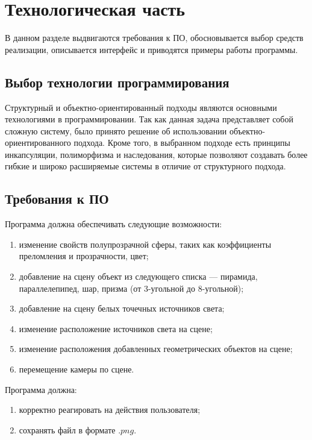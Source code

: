 \section{Технологическая часть}
В данном разделе выдвигаются требования к ПО, обосновывается выбор средств реализации, описывается интерфейс и приводятся примеры работы программы.

\subsection{Выбор технологии программирования}
Структурный и объектно-ориентированный подходы являются основными технологиями в программировании. Так как данная задача представляет собой сложную систему, было принято решение об использовании объектно-ориентированного подхода. Кроме того, в выбранном подходе есть принципы инкапсуляции, полиморфизма и наследования, которые позволяют создавать более гибкие и широко расширяемые системы в отличие от структурного подхода.

\subsection{Требования к ПО}
Программа должна обеспечивать следующие возможности:
\begin{enumerate}
	\item изменение свойств полупрозрачной сферы, таких как коэффициенты преломления и прозрачности, цвет;
	\item добавление на сцену объект из следующего списка --- пирамида, параллелепипед, шар, призма (от 3-угольной до 8-угольной);
	\item добавление на сцену белых точечных источников света;
	\item изменение расположение источников света на сцене;
	\item изменение расположения добавленных геометрических объектов на сцене;
	\item перемещение камеры по сцене.
\end{enumerate}


Программа должна:
\begin{enumerate}
	\item корректно реагировать на действия пользователя;
	\item сохранять файл в формате $.png$.
\end{enumerate}

